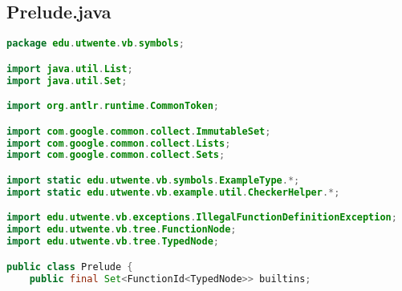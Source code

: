 \subsection{Prelude.java}
\begin{lstlisting}[language=Java]
package edu.utwente.vb.symbols;

import java.util.List;
import java.util.Set;

import org.antlr.runtime.CommonToken;

import com.google.common.collect.ImmutableSet;
import com.google.common.collect.Lists;
import com.google.common.collect.Sets;

import static edu.utwente.vb.symbols.ExampleType.*;
import static edu.utwente.vb.example.util.CheckerHelper.*;

import edu.utwente.vb.exceptions.IllegalFunctionDefinitionException;
import edu.utwente.vb.tree.FunctionNode;
import edu.utwente.vb.tree.TypedNode;

public class Prelude {
	public final Set<FunctionId<TypedNode>> builtins;
	

\end{lstlisting}
